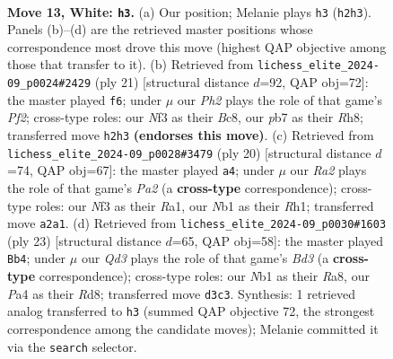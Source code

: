 \documentclass[11pt]{article}
\begin{document}
\begin{figure}[p]\centering
\begin{subfigure}{0.46\textwidth}\centering
\resizebox{\linewidth}{!}{%
\newchessgame
\chessboard[
  setfen={rnbq1rk1/pp1n1pb1/4p1pp/3p4/P2P4/1B1Q1N2/RPP2PPP/1NB1R1K1 w - - 0 13},
  showmover=false,
  pgfstyle=straightmove, color=movearrow, markmove={h2-h3}
]}
\caption{}
\end{subfigure}\hfill
\begin{subfigure}{0.46\textwidth}\centering
\resizebox{\linewidth}{!}{%
\newchessgame
\chessboard[
  setfen={r1b1k2r/1pp1qpp1/pnnb4/4p2p/1P5P/P2PPN2/1B1N1PP1/R2QKB1R b KQkq - 2 11},
  showmover=false,
  pgfstyle=straightmove, color=movearrow, markmove={f7-f6}
]}
\caption{}
\end{subfigure}
\\[4pt]
\begin{subfigure}{0.46\textwidth}\centering
\resizebox{\linewidth}{!}{%
\newchessgame
\chessboard[
  setfen={r1bq1rk1/3nppbp/p4np1/1p1P4/3P1N2/1QN1B3/PP3PPP/R3KB1R w KQ - 2 11},
  showmover=false,
  pgfstyle=straightmove, color=movearrow, markmove={a2-a4}
]}
\caption{}
\end{subfigure}\hfill
\begin{subfigure}{0.46\textwidth}\centering
\resizebox{\linewidth}{!}{%
\newchessgame
\chessboard[
  setfen={r1br2k1/pp3ppp/1qnbpn2/8/2PP4/2B2NP1/P4PBP/RN1Q1RK1 b - - 0 12},
  showmover=false,
  pgfstyle=straightmove, color=movearrow, markmove={d6-b4}
]}
\caption{}
\end{subfigure}
\caption{\textbf{Move 13, White: \texttt{h3}.} (a) Our position; Melanie plays \texttt{h3} (\texttt{h2h3}). Panels (b)--(d) are the retrieved master positions whose correspondence most drove this move (highest QAP objective among those that transfer to it). (b) Retrieved from \texttt{lichess\_elite\_2024-09\_p0024\#2429} (ply 21) [structural distance $d$=92, QAP obj=72]: the master played \texttt{f6}; under $\mu$ our \emph{Ph2} plays the role of that game's \emph{Pf2}; cross-type roles: our \emph{N}f3 as their \emph{B}c8, our \emph{p}b7 as their \emph{R}h8; transferred move \texttt{h2h3} \textbf{(endorses this move)}. (c) Retrieved from \texttt{lichess\_elite\_2024-09\_p0028\#3479} (ply 20) [structural distance $d$=74, QAP obj=67]: the master played \texttt{a4}; under $\mu$ our \emph{Ra2} plays the role of that game's \emph{Pa2} (a \textbf{cross-type} correspondence); cross-type roles: our \emph{N}f3 as their \emph{R}a1, our \emph{N}b1 as their \emph{R}h1; transferred move \texttt{a2a1}. (d) Retrieved from \texttt{lichess\_elite\_2024-09\_p0030\#1603} (ply 23) [structural distance $d$=65, QAP obj=58]: the master played \texttt{Bb4}; under $\mu$ our \emph{Qd3} plays the role of that game's \emph{Bd3} (a \textbf{cross-type} correspondence); cross-type roles: our \emph{N}b1 as their \emph{R}a8, our \emph{P}a4 as their \emph{R}d8; transferred move \texttt{d3c3}. Synthesis: 1 retrieved analog transferred to \texttt{h3} (summed QAP objective 72, the strongest correspondence among the candidate moves); Melanie committed it via the \texttt{search} selector.}
\label{fig:thought-m24}
\end{figure}
\end{document}
